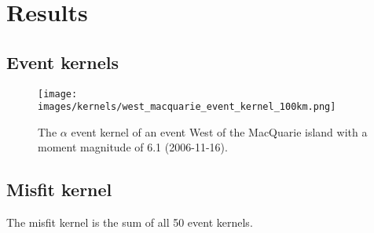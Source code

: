 
\chapter{Results}

\section{Event kernels}

\begin{figure}[h]
\begin{center}
\texttt{[image: images/kernels/west\_macquarie\_event\_kernel\_100km.png]}
\caption{The $\alpha$ event kernel of an event West of the MacQuarie island with a moment magnitude of 6.1 (2006-11-16).}  
\label{w_macq_kernel}
\end{center}
\end{figure}


\section{Misfit kernel}

The misfit kernel is the sum of all 50 event kernels.